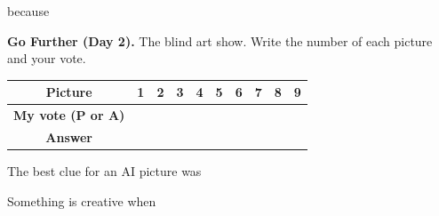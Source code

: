 \documentclass[11pt]{article}
\begin{document}
\vspace{0.6em}
because \ansline{6.3in}{}

\newpage

{\large\textbf{Go Further (Day 2).}} The blind art show. Write the number of each picture and your vote.

\vspace{0.3em}
\begin{tabular}{|c|c|c|c|c|c|c|c|c|c|}
\hline
\textbf{Picture} & 1 & 2 & 3 & 4 & 5 & 6 & 7 & 8 & 9 \\ \hline
\textbf{My vote (P or A)} & & & & & & & & & \\[0.6em] \hline
\textbf{Answer} & & & & & & & & & \\[0.6em] \hline
\end{tabular}

\vspace{0.8em}
The best clue for an AI picture was 

\vspace{0.7em}
Something is creative when 
\end{document}
